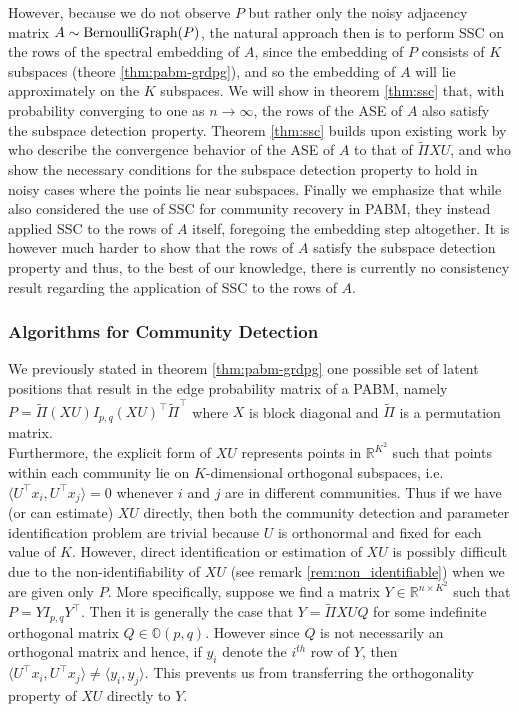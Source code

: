 \documentclass[
  11pt,
]{article}
\theoremstyle{definition}
\theoremstyle{definition}
\theoremstyle{definition}
\theoremstyle{definition}
\theoremstyle{remark}
\begin{document}
However, because we do not observe \(P\) but rather only the noisy
adjacency matrix \(A \sim \mathrm{BernoulliGraph}(P)\), the natural approach then is
to perform SSC on the rows of the spectral embedding of \(A\),
since the embedding of \(P\) consists of \(K\) subspaces (theore \ref{thm:pabm-grdpg}),
and so the embedding of \(A\) will lie approximately on the \(K\) subspaces.
We will show in theorem \ref{thm:ssc} that, with probability converging to
one as \(n \rightarrow \infty\), the rows of the ASE of \(A\) also
satisfy the subspace detection property.
Theorem \ref{thm:ssc} builds upon existing work by
\citet{rubindelanchy2017statistical} who describe the convergence
behavior of the ASE of \(A\) to that of \(\tilde{\Pi} XU\), and
\citet{jmlr-v28-wang13} who show the necessary conditions for the
subspace detection property to hold in noisy cases where the points lie
near subspaces. Finally we emphasize that while
\citet{noroozi2019estimation} also considered the use of SSC for
community recovery in PABM, they instead applied SSC to the rows of
\(A\) itself, foregoing
the embedding step altogether. It is however much harder to show that
the rows of \(A\) satisfy the subspace detection property and thus, to
the best of our knowledge, there is currently no consistency result
regarding the application of SSC to the rows of \(A\).

\hypertarget{algorithms-for-community-detection}{%
\subsubsection{Algorithms for Community Detection}\label{algorithms-for-community-detection}}

We previously stated in theorem \ref{thm:pabm-grdpg} one possible set of latent positions that result in
the edge probability matrix of a PABM, namely
\(P = \tilde{\Pi} (XU) I_{p, q} (XU)^\top \tilde{\Pi}^{\top}\) where \(X\) is block diagonal and
\(\tilde{\Pi}\) is a permutation matrix.\\
Furthermore, the explicit form of \(XU\) represents points in \(\mathbb{R}^{K^2}\)
such that points within each community lie on \(K\)-dimensional
orthogonal subspaces, i.e.~\(\langle U^{\top} x_i, U^{\top} x_j \rangle = 0\) whenever \(i\) and \(j\) are in different communities.
Thus if we have (or can estimate) \(XU\) directly, then both the community
detection and parameter identification problem are trivial because \(U\)
is orthonormal and fixed for each value of \(K\).
However, direct
identification or estimation of \(XU\) is possibly difficult
due to the non-identifiability of \(XU\) (see remark \ref{rem:non_identifiable})
when we are given only \(P\).
More specifically, suppose we find a matrix \(Y \in \mathbb{R}^{n \times K^2}\)
such that \(P = Y I_{p, q} Y^\top\). Then it is generally the case that
\(Y = \tilde{\Pi} XU Q\) for some indefinite orthogonal matrix
\(Q \in \mathbb{O}(p,q)\).
However since \(Q\) is not necessarily an
orthogonal matrix and hence, if \(y_i\) denote the \(i^{th}\) row of \(Y\),
then \(\langle U^{\top} x_i, U^{\top} x_j \rangle \neq \langle y_i, y_j \rangle\).
This prevents us from transferring the orthogonality property of
\(XU\) directly to \(Y\).
\end{document}
